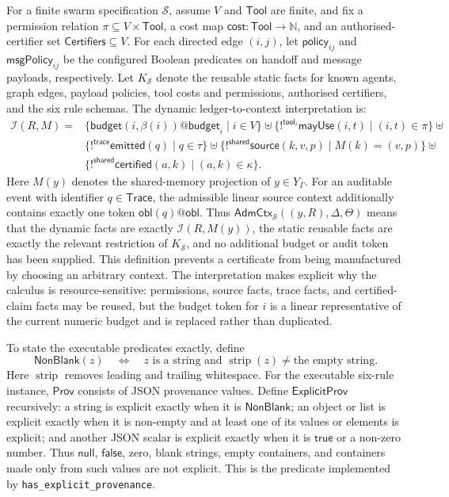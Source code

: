 \documentclass[a4paper,fleqn]{cas-sc}
\newcommand{\Tool}{\mathsf{Tool}}
\newcommand{\Trace}{\mathsf{Trace}}
\newcommand{\cost}{\mathsf{cost}}
\newcommand{\Prov}{\mathsf{Prov}}
\newcommand{\Nat}{\mathbb{N}}
\begin{document}
For a finite swarm specification \(\mathcal S\), assume \(V\) and \(\Tool\)
are finite, and fix a permission relation \(\pi\subseteq V\times\Tool\), a cost map
\(\cost:\Tool\to\Nat\), and an authorised-certifier set
\(\mathsf{Certifiers}\subseteq V\). For each directed edge \((i,j)\), let
\(\mathsf{policy}_{ij}\) and \(\mathsf{msgPolicy}_{ij}\) be the configured
Boolean predicates on handoff and message payloads, respectively. Let
\(K_{\mathcal S}\) denote the reusable static facts for known agents, graph
edges, payload policies, tool costs and permissions, authorised certifiers, and
the six rule schemas. The
dynamic ledger-to-context interpretation is:
\[
\begin{aligned}
  \mathcal{I}(R,M)=&
  \{\mathsf{budget}(i,\beta(i))@\mathsf{budget}_i\mid i\in V\}\uplus
  \{!^{\mathsf{tool}_i}\mathsf{mayUse}(i,t)\mid (i,t)\in\pi\}\uplus{}\\
  &\{!^{\mathsf{trace}}\mathsf{emitted}(q)\mid q\in\tau\}\uplus
  \{!^{\mathsf{shared}}\mathsf{source}(k,v,p)\mid M(k)=(v,p)\}\uplus{}\\
  &\{!^{\mathsf{shared}}\mathsf{certified}(a,k)\mid (a,k)\in\kappa\}.
\end{aligned}
\]
Here \(M(y)\) denotes the shared-memory projection of \(y\in Y_{\Gamma}\).
For an auditable event with identifier \(q\in\Trace\), the admissible linear source
context additionally contains exactly one token
\(\mathsf{obl}(q)@\mathsf{obl}\). Thus
\(\mathsf{AdmCtx}_{\mathcal S}((y,R),\Delta,\Theta)\) means that the dynamic facts
are exactly \(\mathcal I(R,M(y))\), the static reusable facts are exactly the
relevant restriction of \(K_{\mathcal S}\), and no additional budget or audit
token has been supplied. This definition prevents a certificate from being
manufactured by choosing an arbitrary context. The interpretation makes
explicit why the calculus is resource-sensitive: permissions, source facts,
trace facts, and certified-claim facts may be reused, but the budget token for
\(i\) is a linear representative of the current numeric budget and is replaced
rather than duplicated.

To state the executable predicates exactly, define
\[
  \mathsf{NonBlank}(z)
  \quad\Longleftrightarrow\quad
  z\text{ is a string and }\operatorname{strip}(z)\ne\text{the empty string}.
\]
Here \(\operatorname{strip}\) removes leading and trailing whitespace.
For the executable six-rule instance, \(\Prov\) consists of JSON provenance
values. Define \(\mathsf{ExplicitProv}\) recursively: a
string is explicit exactly when it is \(\mathsf{NonBlank}\); an object or list
is explicit exactly when it is non-empty and at least one of its values or
elements is explicit; and another JSON scalar is explicit exactly when it is
\(\mathsf{true}\) or a non-zero number. Thus \(\mathsf{null}\),
\(\mathsf{false}\), zero, blank strings, empty containers, and containers made
only from such values are not explicit. This is the predicate implemented by
\texttt{has\_explicit\_provenance}.
\end{document}

